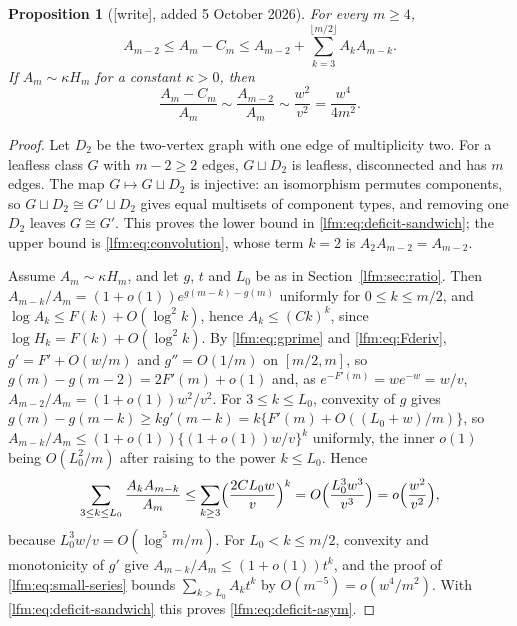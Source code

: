 \documentclass[11pt,letterpaper]{article}
\newtheorem{proposition}[theorem]{Proposition}
\theoremstyle{remark}\newtheorem{remark}[theorem]{Remark}
\begin{document}
\begin{proposition}[{[write]}, added 5 October 2026]\label{lfm:prop:deficit}
For every $m\ge4$,
\begin{equation}
 A_{m-2}\le A_m-C_m\le A_{m-2}
 +\sum_{k=3}^{\lfloor m/2\rfloor}A_kA_{m-k}.\label{lfm:eq:deficit-sandwich}
\end{equation}
If $A_m\sim\kappa H_m$ for a constant $\kappa>0$, then
\begin{equation}
 \frac{A_m-C_m}{A_m}\sim\frac{A_{m-2}}{A_m}\sim\frac{w^2}{v^2}
 =\frac{w^4}{4m^2}.\label{lfm:eq:deficit-asym}
\end{equation}
\end{proposition}
\begin{proof}
Let $D_2$ be the two-vertex graph with one edge of multiplicity two. For a
leafless class $G$ with $m-2\ge2$ edges, $G\sqcup D_2$ is leafless,
disconnected and has $m$ edges. The map $G\mapsto G\sqcup D_2$ is injective:
an isomorphism permutes components, so $G\sqcup D_2\cong G'\sqcup D_2$ gives
equal multisets of component types, and removing one $D_2$ leaves
$G\cong G'$. This proves the lower bound in
\eqref{lfm:eq:deficit-sandwich}; the upper bound is \eqref{lfm:eq:convolution},
whose term $k=2$ is $A_2A_{m-2}=A_{m-2}$.

Assume $A_m\sim\kappa H_m$, and let $g$, $t$ and $L_0$ be as in
Section~\ref{lfm:sec:ratio}. Then
$A_{m-k}/A_m=(1+o(1))e^{g(m-k)-g(m)}$ uniformly for $0\le k\le m/2$, and
$\log A_k\le F(k)+O(\log^2k)$, hence $A_k\le(Ck)^k$, since
$\log H_k=F(k)+O(\log^2k)$. By \eqref{lfm:eq:gprime} and
\eqref{lfm:eq:Fderiv}, $g'=F'+O(w/m)$ and $g''=O(1/m)$ on $[m/2,m]$, so
$g(m)-g(m-2)=2F'(m)+o(1)$ and, as $e^{-F'(m)}=we^{-w}=w/v$,
$A_{m-2}/A_m=(1+o(1))w^2/v^2$. For $3\le k\le L_0$, convexity of $g$ gives
$g(m)-g(m-k)\ge kg'(m-k)=k\{F'(m)+O((L_0+w)/m)\}$, so
$A_{m-k}/A_m\le(1+o(1))\{(1+o(1))w/v\}^k$ uniformly, the inner $o(1)$
being $O(L_0^2/m)$ after raising to the power $k\le L_0$. Hence
\[
 \sum_{3\le k\le L_0}\frac{A_kA_{m-k}}{A_m}
 \le\sum_{k\ge3}\Bigl(\frac{2CL_0w}{v}\Bigr)^k
 =O\Bigl(\frac{L_0^3w^3}{v^3}\Bigr)
 =o\Bigl(\frac{w^2}{v^2}\Bigr),
\]
because $L_0^3w/v=O(\log^5m/m)$. For $L_0<k\le m/2$, convexity and
monotonicity of $g'$ give $A_{m-k}/A_m\le(1+o(1))t^k$, and the proof of
\eqref{lfm:eq:small-series} bounds $\sum_{k>L_0}A_kt^k$ by
$O(m^{-5})=o(w^4/m^2)$. With \eqref{lfm:eq:deficit-sandwich} this proves
\eqref{lfm:eq:deficit-asym}.
\end{proof}
\end{document}
